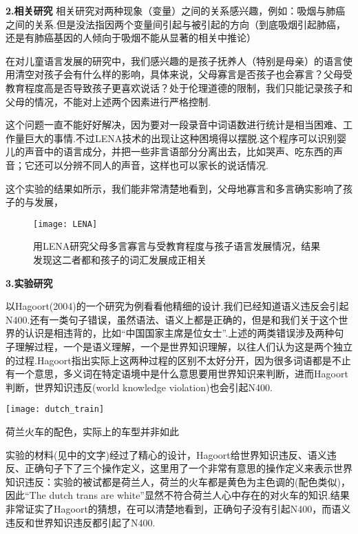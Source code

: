 \textbf{2.相关研究}
相关研究对两种现象（变量）之间的关系感兴趣，例如：吸烟与肺癌之间的关系.但是没法指因两个变量间引起与被引起的方向（到底吸烟引起肺癌，还是有肺癌基因的人倾向于吸烟不能从显著的相关中推论）

在对儿童语言发展的研究中，我们感兴趣的是孩子抚养人（特别是母亲）的语言使用清空对孩子会有什么样的影响，具体来说，父母寡言是否孩子也会寡言？父母受教育程度高是否导致孩子更喜欢说话？处于伦理道德的限制，我们只能记录孩子和父母的情况，不能对上述两个因素进行严格控制.

这个问题一直不能好好解决，因为要对一段录音中词语数进行统计是相当困难、工作量巨大的事情.不过LENA技术的出现让这种困境得以摆脱.这个程序可以识别婴儿的声音中的语言成分，并把一些非言语部分分离出去，比如哭声、吃东西的声音；它还可以分辨不同人的声音，这样也可以家长的说话情况.

这个实验的结果如所示，我们能非常清楚地看到，父母地寡言和多言确实影响了孩子的与发展，
 
\begin{figure*}
    \texttt{[image: LENA]}
    \caption{用LENA研究父母多言寡言与受教育程度与孩子语言发展情况，结果发现这二者都和孩子的词汇发展成正相关}
\end{figure*} 
 
\textbf{3.实验研究}

以Hagoort(2004)的一个研究为例看看他精细的设计.我们已经知道语义违反会引起N400.还有一类句子错误，虽然语法、语义上都是正确的，但是和我们关于这个世界的认识是相违背的，比如“中国国家主席是位女士”.上述的两类错误涉及两种句子理解过程，一个是语义理解，一个是世界知识理解，以往人们认为这是两个独立的过程.Hagoort指出实际上这两种过程的区别不太好分开，因为很多词语都是不止有一个意思，多义词在特定语境中是什么意思要用世界知识来判断，进而Hagoort判断，世界知识违反(world knowledge violation)也会引起N400.

\begin{marginfigure}
    \texttt{[image: dutch\_train]}
    \caption{荷兰火车的配色，实际上的车型并非如此}
\end{marginfigure}

实验的材料(见中的文字)经过了精心的设计，Hagoort给世界知识违反、语义违反、正确句子下了三个操作定义，这里用了一个非常有意思的操作定义来表示世界知识违反：实验的被试都是荷兰人，荷兰的火车都是黄色为主色调的(配色类似)，因此“The dutch trans are white”显然不符合荷兰人心中存在的对火车的知识.结果非常证实了Hagoort的猜想，在可以清楚地看到，正确句子没有引起N400，而语义违反和世界知识违反都引起了N400.

